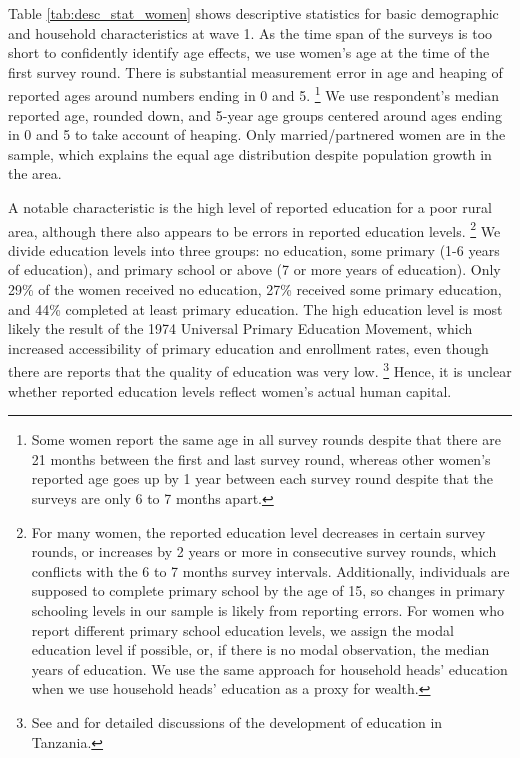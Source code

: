 \documentclass[letterpaper,12pt]{article}
\begin{document}



Table \ref{tab:desc_stat_women} shows descriptive statistics for basic
demographic and household characteristics at wave 1.
As the time span of the surveys is too short to confidently identify age effects,
we use women's age at the time of the first survey round.
There is substantial measurement error in age and heaping of reported ages 
around numbers ending in 0 and 5.%
\footnote{
Some women report the same age in all survey rounds despite that there are
21 months between the first and last survey round, whereas other women's reported 
age goes up by 1 year between each survey round despite that the surveys are only 
6 to 7 months apart.
}
We use respondent's median reported age, rounded down, and 5-year age groups 
centered around ages ending in 0 and 5 to take account of heaping.
Only married/partnered women are in the sample, which explains the 
equal age distribution despite population growth in the area.

A notable characteristic is the high level of reported education for a poor 
rural area, although there also appears to be errors in 
reported education levels.%
\footnote{
For many women, the reported education level decreases in certain survey 
rounds, or increases by 2 years or more in consecutive survey rounds, which 
conflicts with the 6 to 7 months survey intervals. 
Additionally, individuals are supposed to complete primary school by the age of 15,
so changes in primary schooling levels in our sample is likely from reporting 
errors. 
For women who report different primary school education levels, we 
assign the modal education level if possible, or, if there is no modal 
observation, the median years of education.
We use the same approach for household heads' education
when we use household heads' education as a proxy for wealth.
}
We divide education levels into three groups: no education, 
some primary (1-6 years of education), and primary school 
or above (7 or more years of education).
Only 29\% of the women received no education, 27\% received some 
primary education, and 44\% completed at least primary education.
The high education level is most likely the result of the 1974 
Universal Primary Education Movement,
which increased accessibility of primary education and enrollment rates, 
even though there are reports that the quality of education was very low.%
\footnote{
See \cite{Galabawa2001} and \cite{Wedgwood2005} for detailed discussions 
of the development of education in Tanzania.
}
Hence, it is unclear whether reported education levels reflect 
women's actual human capital.
\end{document}
